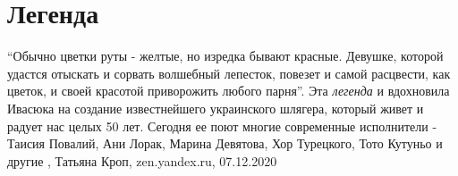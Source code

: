  
 
 
 
 
\chapter{Легенда}
\label{sec:slova.legenda}

\enquote{Обычно цветки руты - желтые, но изредка бывают красные. Девушке,
которой удастся отыскать и сорвать волшебный лепесток, повезет и самой
расцвести, как цветок, и своей красотой приворожить любого парня}.  Эта
\emph{легенда} и вдохновила Ивасюка на создание известнейшего украинского
шлягера, который живет и радует нас целых 50 лет. Сегодня ее поют многие
современные исполнители - Таисия Повалий, Ани Лорак, Марина Девятова, Хор
Турецкого, Тото Кутуньо и другие
, 
Татьяна Кроп, zen.yandex.ru, 07.12.2020

